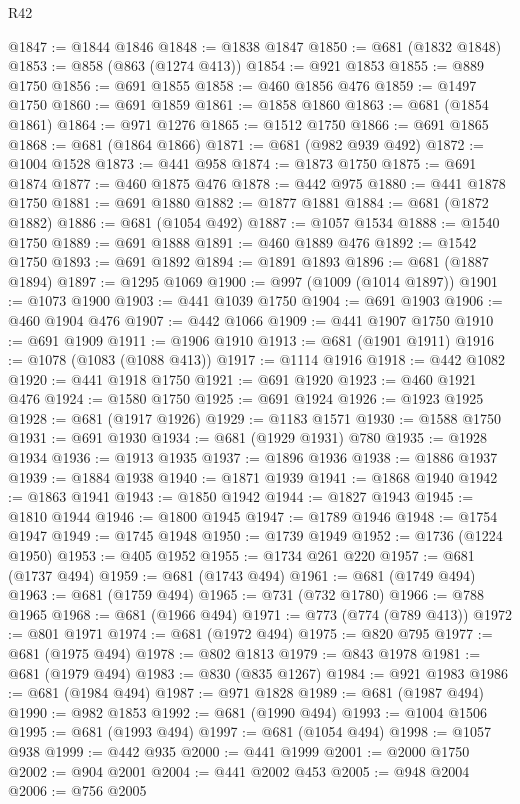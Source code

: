 \begin{lexlean}{R42}
\begin{coremodule}
@1847 := @1844 @1846
@1848 := @1838 @1847
@1850 := @681 (@1832 @1848)
@1853 := @858 (@863 (@1274 @413))
@1854 := @921 @1853
@1855 := @889 @1750
@1856 := @691 @1855
@1858 := @460 @1856 @476
@1859 := @1497 @1750
@1860 := @691 @1859
@1861 := @1858 @1860
@1863 := @681 (@1854 @1861)
@1864 := @971 @1276
@1865 := @1512 @1750
@1866 := @691 @1865
@1868 := @681 (@1864 @1866)
@1871 := @681 (@982 @939 @492)
@1872 := @1004 @1528
@1873 := @441 @958
@1874 := @1873 @1750
@1875 := @691 @1874
@1877 := @460 @1875 @476
@1878 := @442 @975
@1880 := @441 @1878 @1750
@1881 := @691 @1880
@1882 := @1877 @1881
@1884 := @681 (@1872 @1882)
@1886 := @681 (@1054 @492)
@1887 := @1057 @1534
@1888 := @1540 @1750
@1889 := @691 @1888
@1891 := @460 @1889 @476
@1892 := @1542 @1750
@1893 := @691 @1892
@1894 := @1891 @1893
@1896 := @681 (@1887 @1894)
@1897 := @1295 @1069
@1900 := @997 (@1009 (@1014 @1897))
@1901 := @1073 @1900
@1903 := @441 @1039 @1750
@1904 := @691 @1903
@1906 := @460 @1904 @476
@1907 := @442 @1066
@1909 := @441 @1907 @1750
@1910 := @691 @1909
@1911 := @1906 @1910
@1913 := @681 (@1901 @1911)
@1916 := @1078 (@1083 (@1088 @413))
@1917 := @1114 @1916
@1918 := @442 @1082
@1920 := @441 @1918 @1750
@1921 := @691 @1920
@1923 := @460 @1921 @476
@1924 := @1580 @1750
@1925 := @691 @1924
@1926 := @1923 @1925
@1928 := @681 (@1917 @1926)
@1929 := @1183 @1571
@1930 := @1588 @1750
@1931 := @691 @1930
@1934 := @681 (@1929 @1931) @780
@1935 := @1928 @1934
@1936 := @1913 @1935
@1937 := @1896 @1936
@1938 := @1886 @1937
@1939 := @1884 @1938
@1940 := @1871 @1939
@1941 := @1868 @1940
@1942 := @1863 @1941
@1943 := @1850 @1942
@1944 := @1827 @1943
@1945 := @1810 @1944
@1946 := @1800 @1945
@1947 := @1789 @1946
@1948 := @1754 @1947
@1949 := @1745 @1948
@1950 := @1739 @1949
@1952 := @1736 (@1224 @1950)
@1953 := @405 @1952
@1955 := @1734 @261 @220
@1957 := @681 (@1737 @494)
@1959 := @681 (@1743 @494)
@1961 := @681 (@1749 @494)
@1963 := @681 (@1759 @494)
@1965 := @731 (@732 @1780)
@1966 := @788 @1965
@1968 := @681 (@1966 @494)
@1971 := @773 (@774 (@789 @413))
@1972 := @801 @1971
@1974 := @681 (@1972 @494)
@1975 := @820 @795
@1977 := @681 (@1975 @494)
@1978 := @802 @1813
@1979 := @843 @1978
@1981 := @681 (@1979 @494)
@1983 := @830 (@835 @1267)
@1984 := @921 @1983
@1986 := @681 (@1984 @494)
@1987 := @971 @1828
@1989 := @681 (@1987 @494)
@1990 := @982 @1853
@1992 := @681 (@1990 @494)
@1993 := @1004 @1506
@1995 := @681 (@1993 @494)
@1997 := @681 (@1054 @494)
@1998 := @1057 @938
@1999 := @442 @935
@2000 := @441 @1999
@2001 := @2000 @1750
@2002 := @904 @2001
@2004 := @441 @2002 @453
@2005 := @948 @2004
@2006 := @756 @2005

\end{coremodule}
\end{lexlean}
